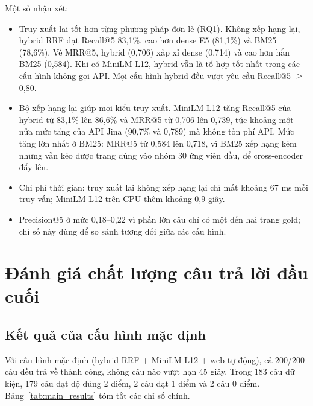 Một số nhận xét:
\begin{itemize}
    \item Truy xuất lai tốt hơn từng phương pháp đơn lẻ (RQ1). Không xếp hạng lại, hybrid RRF đạt Recall@5 83,1\%, cao hơn dense E5 (81,1\%) và BM25 (78,6\%). Về MRR@5, hybrid (0,706) xấp xỉ dense (0,714) và cao hơn hẳn BM25 (0,584). Khi có MiniLM-L12, hybrid vẫn là tổ hợp tốt nhất trong các cấu hình không gọi API. Mọi cấu hình hybrid đều vượt yêu cầu Recall@5 $\geq$ 0,80.
    \item Bộ xếp hạng lại giúp mọi kiểu truy xuất. MiniLM-L12 tăng Recall@5 của hybrid từ 83,1\% lên 86,6\% và MRR@5 từ 0,706 lên 0,739, tức khoảng một nửa mức tăng của API Jina (90,7\% và 0,789) mà không tốn phí API. Mức tăng lớn nhất ở BM25: MRR@5 từ 0,584 lên 0,718, vì BM25 xếp hạng kém nhưng vẫn kéo được trang đúng vào nhóm 30 ứng viên đầu, để cross-encoder đẩy lên.
    \item Chi phí thời gian: truy xuất lai không xếp hạng lại chỉ mất khoảng 67 ms mỗi truy vấn; MiniLM-L12 trên CPU thêm khoảng 0,9 giây.
    \item Precision@5 ở mức 0,18--0,22 vì phần lớn câu chỉ có một đến hai trang gold; chỉ số này dùng để so sánh tương đối giữa các cấu hình.
\end{itemize}

\section{Đánh giá chất lượng câu trả lời đầu cuối}
\label{sec:eval_answer}

\subsection{Kết quả của cấu hình mặc định}
\label{sec:main_results}

Với cấu hình mặc định (hybrid RRF + MiniLM-L12 + web tự động), cả 200/200 câu đều trả về thành công, không câu nào vượt hạn 45 giây. Trong 183 câu dữ kiện, 179 câu đạt độ đúng 2 điểm, 2 câu đạt 1 điểm và 2 câu 0 điểm. Bảng~\ref{tab:main_results} tóm tắt các chỉ số chính.

